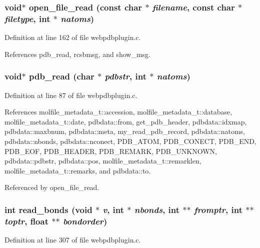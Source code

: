 \subsubsection{\setlength{\rightskip}{0pt plus 5cm}void$\ast$ open\_\-file\_\-read (const char $\ast$ {\em filename}, const char $\ast$ {\em filetype}, int $\ast$ {\em natoms})\hspace{0.3cm}{\tt  [static]}}\label{webpdbplugin_8c_a5}




Definition at line 162 of file webpdbplugin.c.

References pdb\_\-read, rcsbmsg, and show\_\-msg.
\subsubsection{\setlength{\rightskip}{0pt plus 5cm}void$\ast$ pdb\_\-read (char $\ast$ {\em pdbstr}, int $\ast$ {\em natoms})\hspace{0.3cm}{\tt  [static]}}\label{webpdbplugin_8c_a4}




Definition at line 87 of file webpdbplugin.c.

References molfile\_\-metadata\_\-t::accession, molfile\_\-metadata\_\-t::database, molfile\_\-metadata\_\-t::date, pdbdata::from, get\_\-pdb\_\-header, pdbdata::idxmap, pdbdata::maxbnum, pdbdata::meta, my\_\-read\_\-pdb\_\-record, pdbdata::natoms, pdbdata::nbonds, pdbdata::nconect, PDB\_\-ATOM, PDB\_\-CONECT, PDB\_\-END, PDB\_\-EOF, PDB\_\-HEADER, PDB\_\-REMARK, PDB\_\-UNKNOWN, pdbdata::pdbstr, pdbdata::pos, molfile\_\-metadata\_\-t::remarklen, molfile\_\-metadata\_\-t::remarks, and pdbdata::to.

Referenced by open\_\-file\_\-read.
\subsubsection{\setlength{\rightskip}{0pt plus 5cm}int read\_\-bonds (void $\ast$ {\em v}, int $\ast$ {\em nbonds}, int $\ast$$\ast$ {\em fromptr}, int $\ast$$\ast$ {\em toptr}, float $\ast$$\ast$ {\em bondorder})\hspace{0.3cm}{\tt  [static]}}\label{webpdbplugin_8c_a7}




Definition at line 307 of file webpdbplugin.c.

